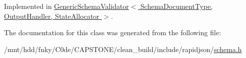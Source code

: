 Implemented in \hyperlink{classGenericSchemaValidator_a7c999dfb3118aaa08495d60eee6d3732}{Generic\+Schema\+Validator$<$ Schema\+Document\+Type, Output\+Handler, State\+Allocator $>$}.



The documentation for this class was generated from the following file\+:\begin{DoxyCompactItemize}
\item 
/mnt/hdd/fnky/\+C0de/\+C\+A\+P\+S\+T\+O\+N\+E/clean\+\_\+build/include/rapidjson/\hyperlink{schema_8h}{schema.\+h}\end{DoxyCompactItemize}
